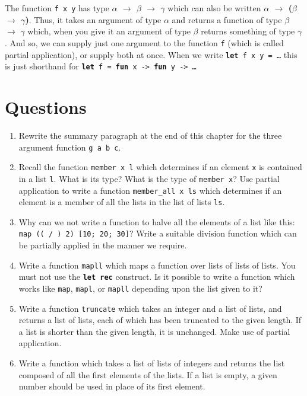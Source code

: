 \documentclass[]{book}
\begin{document}
The function \texttt{f\! x\! y} has type \textsf{\textbf{$\alpha$ $\rightarrow$ $\beta$ $\rightarrow$ $\gamma$}} which can also be written \textsf{\textbf{$\alpha$ $\rightarrow$ \textmd{(}$\beta$ $\rightarrow$ $\gamma$\textmd{)}}}. Thus, it takes an argument of type $\alpha$ and returns a function of type $\beta$ $\rightarrow$ $\gamma$ which, when you give it an argument of type $\beta$ returns something of type $\gamma$. And so, we can supply just one argument to the function \texttt{f} (which is called partial application), or supply both at once. When we write \texttt{\textbf{let}\! f\! x\! y\! =\! \ldots} this is just shorthand for \texttt{\textbf{let}\! f\! =\! \textbf{fun}\! x\! ->\! \textbf{fun}\! y\! ->\! \ldots}
 
\clearpage
\section*{Questions}

\begin{enumerate}
  \item Rewrite the summary paragraph at the end of this chapter for the three argument function \texttt{g a b c}.
  \item Recall the function \texttt{member x l} which determines if an element \texttt{x} is contained in a list \texttt{l}. What is its type? What is the type of \texttt{member x}? Use partial application to write a function \texttt{member\_all x ls} which determines if an element is a member of all the lists in the list of lists \texttt{ls}. 
  \item Why can we not write a function to halve all the elements of a list like this: \texttt{map (( / ) 2) [10; 20; 30]}? Write a suitable division function which can be partially applied in the manner we require.
  \item Write a function \texttt{mapll} which maps a function over lists of lists of lists. You must not use the \textbf{\texttt{let rec}} construct. Is it possible to write a function which works like \texttt{map}, \texttt{mapl}, or \texttt{mapll} depending upon the list given to it?
  \item Write a function \texttt{truncate} which takes an integer and a list of lists, and returns a list of lists, each of which has been truncated to the given length. If a list is shorter than the given length, it is unchanged. Make use of partial application.
  \item Write a function which takes a list of lists of integers and returns the list composed of all the first elements of the lists. If a list is empty, a given number should be used in place of its first element.
\end{enumerate}
\end{document}

